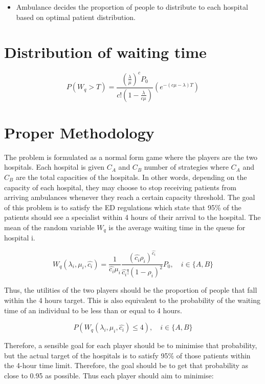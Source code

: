 \documentclass{article}
\begin{document}
\begin{itemize}
    \item Ambulance decides the proportion of people to distribute to each hospital based on optimal patient distribution.
\end{itemize}


\section{Distribution of waiting time}
\begin{equation}
    P(W_q > T) = \frac{(\frac{\lambda}{\mu})^c P_0}{c!(1-\frac{\lambda}{c \mu})} (e^{-(c \mu - \lambda)T})
\end{equation}



\newpage
\section{Proper Methodology}
The problem is formulated as a normal form game where the players are the two hospitals. Each hospital is given $C_A$ and $C_B$ number of strategies where $C_A$ and $C_B$ are the total capacities of the hospitals. In other words, depending on the capacity of each hospital, they may choose to stop receiving patients from arriving ambulances whenever they reach a certain capacity threshold. The goal of this problem is to satisfy the ED regulations which state that 95\% of the patients should see a specialist within 4 hours of their arrival to the hospital. The mean of the random variable $W_q$ is the average waiting time in the queue for hospital i.


\begin{equation}
     W_q(\lambda_i, \mu_i, \hat{c_i}) = \frac{1}{\hat{c_i} \mu_i} \frac{(\hat{c_i} \rho_i) ^ {\hat{c_i}}}{\hat{c_i}! (1 - \rho_i) ^ 2}P_0, \quad i \in \{A,B\}
\end{equation}

Thus, the utilities of the two players should be the proportion of people that fall within the 4 hours target. This is also equivalent to the probability of the waiting time of an individual to be less than or equal to 4 hours. 

\begin{equation}
    P(W_q(\lambda_i, \mu_i, \hat{c_i}) \leq 4), \quad i \in \{A,B\}
\end{equation}

Therefore, a sensible goal for each player should be to minimise that probability, but the actual target of the hospitals is to satisfy 95\% of those patients within the 4-hour time limit. Therefore, the goal should be to get that probability as close to 0.95 as possible. Thus each player should aim to minimise:
\end{document}

